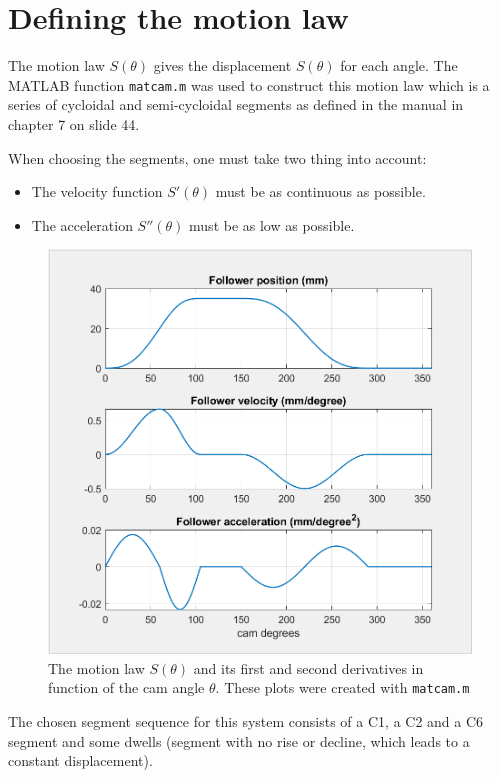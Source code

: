 \documentclass[a4paper]{article}
\begin{document}
\clearpage
\tableofcontents

\section{Defining the motion law}

The motion law \(S(\theta)\) gives the displacement \(S(\theta)\) for each angle. The MATLAB function \texttt{matcam.m} was used to construct this motion law which is a series of cycloidal and semi-cycloidal segments as defined in the manual \cite{cursus} in chapter 7 on slide 44.

When choosing the segments, one must take two thing into account:
\begin{itemize}
	\item The velocity function \(S'(\theta)\) must be as continuous as possible.
	\item The acceleration \(S''(\theta)\) must be as low as possible.
\end{itemize}


\begin{figure}[h]
	\centering
	\includegraphics[width=.7\textwidth]{hefwet.png}
	\caption{The motion law \(S(\theta)\) and its first and second derivatives in function of the cam angle \(\theta\). These plots were created with \texttt{matcam.m}}
	\label{fig:hefwet}
	
\end{figure}

The chosen segment sequence for this system consists of a C1, a C2 and a C6 segment and some dwells (segment with no rise or decline, which leads to a constant displacement).
\end{document}
